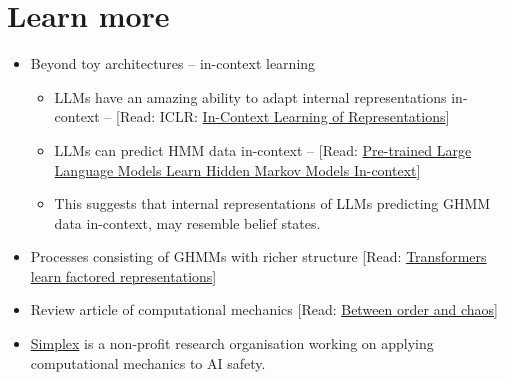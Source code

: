 \documentclass[11pt]{article}
\begin{document}
\section{Learn more}\label{learn-more}

\begin{itemize}
\item
  Beyond toy architectures -- in-context learning
  \begin{itemize}
  \item
    LLMs have an amazing ability to adapt internal representations in-context -- {[}Read: ICLR: \href{https://arxiv.org/pdf/2501.00070}{In-Context Learning of Representations}{]}
  \item
    LLMs can predict HMM data in-context -- {[}Read: \href{https://arxiv.org/pdf/2506.07298}{Pre-trained Large Language Models Learn Hidden Markov Models In-context}{]}
  \item
    This suggests that internal representations of LLMs predicting GHMM data in-context, may resemble belief states.
  \end{itemize}
\item
  Processes consisting of GHMMs with richer structure {[}Read: \href{https://arxiv.org/pdf/2602.02385v1}{Transformers learn factored representations}{]}
\item
  Review article of computational mechanics {[}Read: \href{https://www.nature.com/articles/nphys2190}{Between order and chaos}{]}
\item
  \href{https://www.simplexaisafety.com/}{Simplex} is a non-profit research organisation working on applying computational mechanics to AI safety.
\end{itemize}
\end{document}
